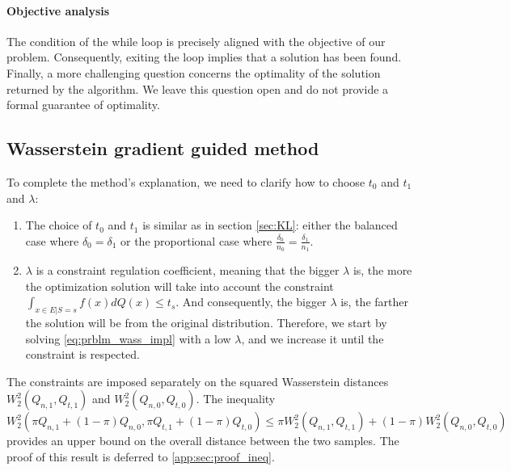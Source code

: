 \documentclass[runningheads, orivec]{llncs}
\begin{document}
\paragraph{Objective analysis} 
The condition of the while loop is precisely aligned with the objective of our problem. Consequently, exiting the loop implies that a solution has been found. Finally, a more challenging question concerns the optimality of the solution returned by the algorithm. We leave this question open and do not provide a formal guarantee of optimality.


\subsection{Wasserstein gradient guided method}
\label{app:sec:wass_grad}

To complete the method's explanation, we need to clarify how to choose $t_0$ and $t_1$ and $\lambda$:
\begin{enumerate}
    \item The choice of $t_0$ and $t_1$ is similar as in section \ref{sec:KL}: either the balanced case where $\delta_0 = \delta_1$ or the proportional case where $\frac{\delta_0}{n_0} = \frac{\delta_1}{n_1}$.
    \item $\lambda$ is a constraint regulation coefficient, meaning that the bigger $\lambda$ is, the more the optimization solution will take into account the constraint \\ $\int_{x \in E | S = s} f(x)dQ(x) \leq t_{s}$. And consequently, the bigger $\lambda$ is, the farther the solution will be from the original distribution. 
    Therefore, we start by solving \eqref{eq:prblm_wass_impl} with a low $\lambda$, and we increase it until the constraint is respected.
\end{enumerate}

The constraints are imposed separately on the squared Wasserstein distances $W_2^2(Q_{n,1}, Q_{t,1})$ and $W_2^2(Q_{n,0}, Q_{t,0})$. The inequality $W_2^2(\pi Q_{n,1} + (1-\pi)Q_{n,0} , \pi Q_{t,1} + (1-\pi)Q_{t,0}) \leq \pi W_2^2(Q_{n,1}, Q_{t,1}) + (1 - \pi) W_2^2(Q_{n,0}, Q_{t,0})$ provides an upper bound on the overall distance between the two samples. The proof of this result is deferred to \ref{app:sec:proof_ineq}.
\end{document}
